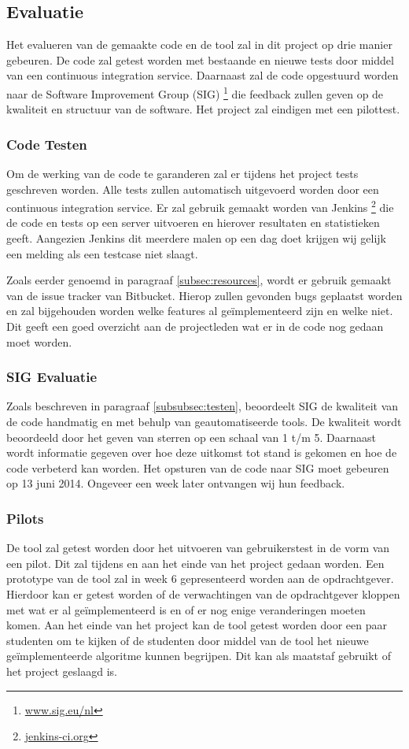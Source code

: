 \subsection{Evaluatie}
Het evalueren van de gemaakte code en de tool zal in dit project op drie manier gebeuren. De code zal getest worden met bestaande en nieuwe tests door middel van een continuous integration service. Daarnaast zal de code opgestuurd worden naar de Software Improvement Group (SIG) \footnote{\href{http://www.sig.eu/nl}{www.sig.eu/nl}} die feedback zullen geven op de kwaliteit en structuur van de software. Het project zal eindigen met een pilottest.

\subsubsection{Code Testen}
Om de werking van de code te garanderen zal er tijdens het project tests geschreven worden. Alle tests zullen automatisch uitgevoerd worden door een continuous integration service. Er zal gebruik gemaakt worden van Jenkins \footnote{\href{http://jenkins-ci.org}{jenkins-ci.org}} die de code en tests op een server uitvoeren en hierover resultaten en statistieken geeft. Aangezien Jenkins dit meerdere malen op een dag doet krijgen wij gelijk een melding als een testcase niet slaagt.

Zoals eerder genoemd in paragraaf \ref{subsec:resources}, wordt er gebruik gemaakt van de issue tracker van Bitbucket. Hierop zullen gevonden bugs geplaatst worden en zal bijgehouden worden welke features al ge\"implementeerd zijn en welke niet. Dit geeft een goed overzicht aan de projectleden wat er in de code nog gedaan moet worden.

\subsubsection{SIG Evaluatie}
Zoals beschreven in paragraaf \ref{subsubsec:testen}, beoordeelt SIG de kwaliteit van de code handmatig en met behulp van geautomatiseerde tools. De kwaliteit wordt beoordeeld door het geven van sterren op een schaal van 1 t/m 5. Daarnaast wordt informatie gegeven over hoe deze uitkomst tot stand is gekomen en hoe de code verbeterd kan worden. Het opsturen van de code naar SIG moet gebeuren op 13 juni 2014. Ongeveer een week later ontvangen wij hun feedback.

\subsubsection{Pilots}
De tool zal getest worden door het uitvoeren van gebruikerstest in de vorm van een pilot. Dit zal tijdens en aan het einde van het project gedaan worden. Een prototype van de tool zal in week 6 gepresenteerd worden aan de opdrachtgever. Hierdoor kan er getest worden of de verwachtingen van de opdrachtgever kloppen met wat er al ge\"implementeerd is en of er nog enige veranderingen moeten komen. Aan het einde van het project kan de tool getest worden door een paar studenten om te kijken of de studenten door middel van de tool het nieuwe ge\"implementeerde algoritme kunnen begrijpen. Dit kan als maatstaf gebruikt of het project geslaagd is.
